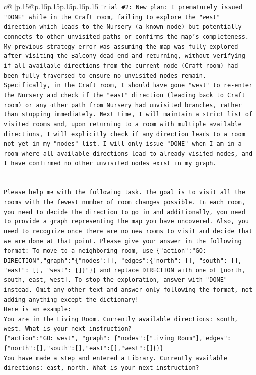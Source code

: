 \documentclass{article}
\begin{document}
{\begin{supertabular}{c@{$\;$}|p{.15\linewidth}@{}p{.15\linewidth}p{.15\linewidth}p{.15\linewidth}p{.15\linewidth}p{.15\linewidth}}
{{{\texttt{Trial \#2: New plan: I prematurely issued "DONE" while in the Craft room, failing to explore the "west" direction which leads to the Nursery (a known node) but potentially connects to other unvisited paths or confirms the map's completeness. My previous strategy error was assuming the map was fully explored after visiting the Balcony dead{-}end and returning, without verifying if all available directions from the current node (Craft room) had been fully traversed to ensure no unvisited nodes remain. Specifically, in the Craft room, I should have gone "west" to re{-}enter the Nursery and check if the "east" direction (leading back to Craft room) or any other path from Nursery had unvisited branches, rather than stopping immediately. Next time, I will maintain a strict list of visited rooms and, upon returning to a room with multiple available directions, I will explicitly check if any direction leads to a room not yet in my "nodes" list. I will only issue "DONE" when I am in a room where all available directions lead to already visited nodes, and I have confirmed no other unvisited nodes exist in my graph.} \\
\\ 
\\ 
\texttt{Please help me with the following task. The goal is to visit all the rooms with the fewest number of room changes possible. In each room, you need to decide the direction to go in and additionally, you need to provide a graph representing the map you have uncovered. Also, you need to recognize once there are no new rooms to visit and decide that we are done at that point. Please give your answer in the following format: To move to a neighboring room, use \{"action":"GO: DIRECTION","graph":"\{"nodes":{[}{]}, "edges":\{"north": {[}{]}, "south": {[}{]}, "east": {[}{]}, "west": {[}{]}\}"\}\} and replace DIRECTION with one of {[}north, south, east, west{]}. To stop the exploration, answer with "DONE" instead. Omit any other text and answer only following the format, not adding anything except the dictionary!} \\
\texttt{Here is an example: } \\
\texttt{You are in the Living Room. Currently available directions: south, west. What is your next instruction?} \\
\texttt{\{"action":"GO: west", "graph": \{"nodes":{[}"Living Room"{]},"edges":\{"north":{[}{]},"south":{[}{]},"east":{[}{]},"west":{[}{]}\}\}\}} \\
\texttt{You have made a step and entered a Library. Currently available directions: east, north. What is your next instruction?} \\
}}}
\end{supertabular}}
\end{document}
